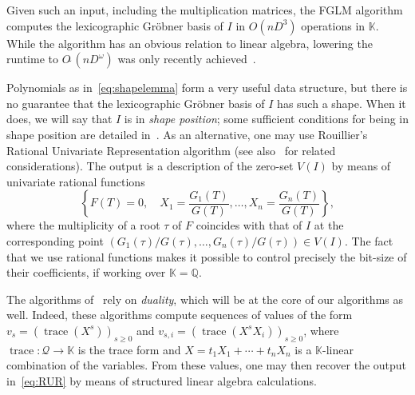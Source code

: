 \documentclass[12pt]{article}
\newcommand{\trace}{\operatorname{trace}}
\newcommand{\lf}{X}
\newcommand{\residueI}{\mathscr{Q}}
\def\Q {\ensuremath{\mathbb{Q}}}
\def\K{\mathbb{K}}
\def\K {\ensuremath{\mathbb{K}}}
\begin{document}
Given such an input, including the multiplication matrices, the FGLM
algorithm~\cite{FaGiLaMo93} computes the lexicographic Gr\"obner basis
of $I$ in $O(nD^3)$ operations in $\K$.  While the algorithm has an
obvious relation to linear algebra, lowering the runtime to
$O\tilde{~}(nD^\omega)$ was only recently
achieved~\cite{FaGaHuRe13,FaGaHuRe14,Neiger16}.

Polynomials as in~\cref{eq:shapelemma} form a very useful data
structure, but there is no guarantee that the lexicographic Gr\"obner
basis of $I$ has such a shape. When it does, we will say that $I$ is
in {\em shape position}; some sufficient conditions for being in shape
position are detailed in~\cite{BeMoMaTr94}.  As an alternative, one
may use Rouillier's Rational Univariate Representation algorithm
\cite{Rouillier99} (see also~\cite{AlBeRoWo94,BeWo96} for related
considerations). The output is a description of the zero-set $V(I)$ by
means of univariate rational functions
\begin{equation}\label{eq:RUR}
 \left\{  F(T)=0, \quad X_1 = \frac{G_1(T)}{G(T)}, \dots,X_n = \frac{G_n(T)}{G(T)} \right\},
\end{equation}
where the multiplicity of a root $\tau$ of $F$ coincides with that of
$I$ at the corresponding point
$(G_1(\tau)/G(\tau),\dots,G_n(\tau)/G(\tau)) \in V(I)$. The fact that
we use rational functions makes it possible to control
precisely the bit-size of their coefficients, if working over $\K=\Q$.

The algorithms of~\cite{AlBeRoWo94, BeWo96, Rouillier99} rely on
\emph{duality}, which will be at the core of our algorithms as well.
Indeed, these algorithms compute sequences of values of the form
$v_s=(\trace(\lf^s))_{s \ge 0}$ and 
$v_{s,i}=(\trace(\lf^s X_i))_{s \ge 0}$, where $\trace: \residueI \to \K$ is the trace 
form and $\lf=t_1 X_1 + \cdots + t_n X_n$ is  a $\K$-linear combination of the variables.
From these values, one may then recover the output in~\cref{eq:RUR} by means
of structured linear algebra calculations.
\end{document}
